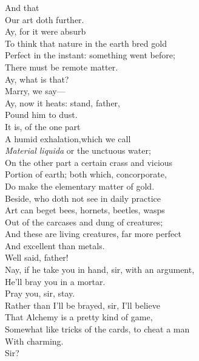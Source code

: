 \documentclass[a4paper,oneside,12pt]{memoir}
\begin{document}
\begin{drama*}
\mammonspeaks {} And that\\
Our art doth further.\\
\subtlespeaks {} Ay, for it were absurb\\
To think that nature in the earth bred gold\\
Perfect in the instant: something went before;\\
There must be remote matter.\\
\surlyspeaks {} Ay, what is that?\\
\subtlespeaks Marry, we say---\\
\mammonspeaks {} Ay, now it heats: stand, father,\\
Pound him to dust.\\
\subtlespeaks {} It is, of the one part\\
A humid exhalation,which we call\\
\emph{Material liquida} or the unctuous water;\\
On the other part a certain crass and vicious\\
Portion of earth; both which, concorporate,\\
Do make the elementary matter of gold.\\
Beside, who doth not see in daily practice\\
Art can beget bees, hornets, beetles, wasps\\
Out of the carcases and dung of creatures;\\
And these are living creatures, far more perfect\\
And excellent than metals.\\
\mammonspeaks {} Well said, father!\\
Nay, if he take you in hand, sir, with an argument,\\
He'll bray you in a mortar.\\
\surlyspeaks {} Pray you, sir, stay.\\
Rather than I'll be brayed, sir, I'll believe\\
That Alchemy is a pretty kind of game,\\
Somewhat like tricks of the cards, to cheat a man\\
With charming.\\
\subtlespeaks {} Sir?\\

\end{drama*}
\end{document}
